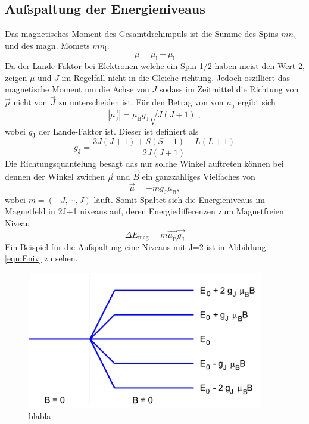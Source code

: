 \subsection{Aufspaltung der Energieniveaus}
Das magnetisches Moment des Gesamtdrehimpuls ist die Summe des Spins $mn_\text{s}$ und des magn. Momets $mn_\text{l}$.
\begin{equation}
  \mu = \mu_\text{l} + \mu_\text{l}
\end{equation}
Da der Lande-Faktor bei Elektronen welche ein Spin 1/2 haben meist den Wert 2, zeigen $\mu$ und $J$ im Regelfall nicht in die Gleiche richtung. Jedoch oszilliert das magnetische Moment um die Achse von $J$ sodass im Zeitmittel die Richtung von $\vec{\mu}$ nicht von $\vec{J}$ zu unterscheiden ist. Für den Betrag von von $\mu_\text{J}$ ergibt sich 
\begin{equation}
  |\vec{\mu_\text{J}}| = \mu_\text{B} g_\text{J} \sqrt{J(J+1)} \ ,
  \label{eqn:muJ}
\end{equation}
wobei $g_\text{J}$ der Lande-Faktor ist. Dieser ist definiert als
\begin{equation}
  g_\text{J} = \frac{3J(J+1) + S(S+1) -L(L+1)}{2J(J+1)}
  \label{eqn:Lan}
\end{equation}
Die Richtungsquantelung besagt das nur solche Winkel auftreten können bei dennen der Winkel zwichen $\vec{\mu}$ und $\vec{B}$ ein ganzzahliges Vielfaches von
\begin{equation}
\vec{\mu} = -m g_\text{J} \mu_\text{B}, 
  \label{eqn:mu}
\end{equation}
wobei  $m  = (-J, \cdots, J)$ läuft. Somit Spaltet sich die Energieniveaus im Magnetfeld in 2J+1 niveaus auf, deren Energiedifferenzen zum Magnetfreien Niveau
\begin{equation}
	\Delta E_\text{mag} = m \vec{\mu_\text{B}} \vec{g_\text{J}}
  \label{eqn:delE}
\end{equation}
Ein Beispiel für die Aufspaltung eine Niveaus mit J=2 ist in Abbildung \ref{eqn:Eniv} zu sehen.
\begin{figure}
  \centering
  \includegraphics[height=6cm]{./Bilder/ENiveaus.png}
  \caption{blabla}
   \label{fig:Eniv}
\end{figure}

